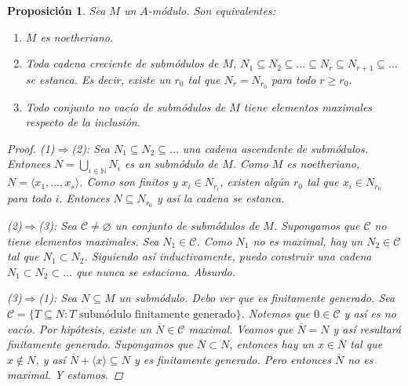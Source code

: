 \documentclass[12pt]{book}
\newtheorem{prop}[teo]{Proposición}
\theoremstyle{definition}
\newcommand{\NN}{\mathbb{N}}
\let\emptyset\varnothing
\begin{document}
\begin{prop}
Sea $M$ un $A$-módulo. Son equivalentes:
\begin{enumerate}
\item $M$ es noetheriano.
\item Toda cadena creciente de submódulos de $M$, $N_1\subseteq N_2\subseteq \ldots \subseteq N_r\subseteq N_{r+1}\subseteq \ldots$ se estanca. Es decir, existe un $r_0$ tal que $N_r = N_{r_0}$ para todo $r\geq r_0$.
\item Todo conjunto no vacío de submódulos de $M$ tiene elementos maximales respecto de la inclusión.
\end{enumerate}
\begin{proof}
(1)$\Longrightarrow$(2): Sea $N_1\subseteq N_2\subseteq \ldots$ una cadena ascendente de submódulos. Entonces $N=\displaystyle\bigcup_{i\in\NN}N_i$ es un submódulo de $M$. Como $M$ es noetheriano, $N=\langle x_1,\ldots , x_s\rangle$. Como son finitos y $x_i\in N_{r_i}$, existen algún $r_0$ tal que $x_i\in N_{r_0}$ para todo $i$. Entonces $N\subseteq N_{r_0}$ y así la cadena se estanca.

(2)$\Longrightarrow$(3): Sea $\mathcal{C}\neq \emptyset$ un conjunto de submódulos de $M$. Supongamos que $\mathcal{C}$ no tiene elementos maximales. Sea $N_1\in\mathcal{C}$. Como $N_1$ no es maximal, hay un $N_2\in\mathcal{C}$ tal que $N_1\subset N_2$. Siguiendo así inductivamente, puedo construir una cadena $N_1\subset N_2\subset\ldots $ que nunca se estaciona. Absurdo.

(3)$\Longrightarrow$(1): Sea $N\subseteq M$ un submódulo. Debo ver que es finitamente generado. Sea $\mathcal{C}=\{T\subseteq N : T \text{ submódulo finitamente generado}\}$. Notemos que $0\in\mathcal{C}$ y así es no vacío. Por hipótesis, existe un $\overline{N}\in\mathcal{C}$ maximal. Veamos que $\overline{N}=N$ y así resultará finitamente generado. Supongamos que $\overline{N}\subset N$, entonces hay un $x\in\overline{N}$ tal que $x\notin N$, y así $\overline{N} + \langle x\rangle\subseteq N$ y es finitamente generado. Pero entonces $\overline{N}$ no es maximal. Y estamos. 

\end{proof}
\end{prop}
\end{document}

